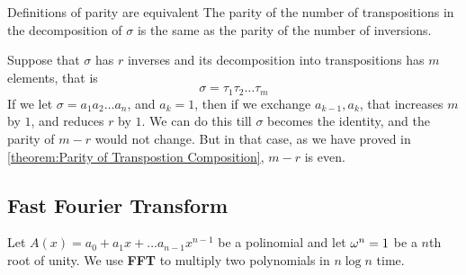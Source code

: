 \theo{}
{Definitions of parity are equivalent}{
    The parity of the number of transpositions in the decomposition of
    $\sigma$ is the same as the parity of the number of inversions.
}

\begin{prooof}
    Suppose that $\sigma$ has $r$ inverses and its decomposition into
    transpositions has $m$ elements, that is
    \[\sigma = \tau_1\tau_2\dots \tau_m\] 
    If we let $\sigma = a_1a_2\dots a_n$, and $a_k =1$, then if we exchange
    $a_{k-1}, a_k$, that increases $m$ by $1$, and reduces $r$ by $1$. We can
    do this till $\sigma$ becomes the identity, and the parity of $m-r$ would
    not change. But in that case, as we have proved in \autoref{theorem:Parity
    of Transpostion Composition}, $m-r$ is even.
\end{prooof}



\newpage
\subsection{Fast Fourier Transform}

Let $ A(x) = a_0 + a_1x + \dots a_{n-1}x^{n-1} $ be a polinomial and let $
\omega^n = 1 $ be a $ n $th root of unity. We use \textbf{FFT} to multiply two
polynomials in $ n\log n $ time.

